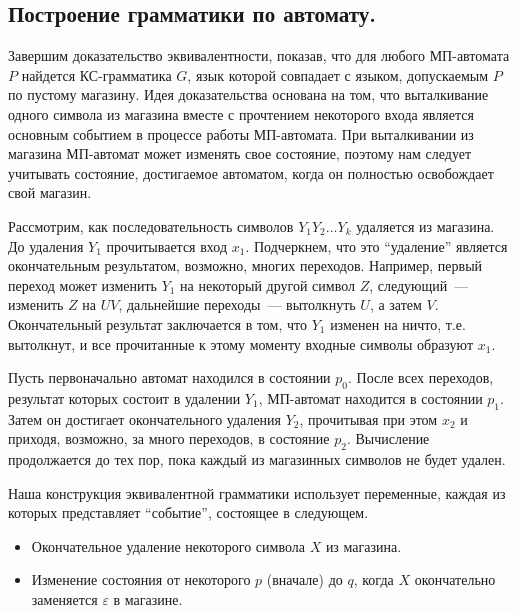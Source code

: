 \documentclass[a4paper,12pt]{article}
\begin{document}
\subsection{Построение грамматики по автомату.}
Завершим доказательство эквивалентности, показав, что для любого МП-автомата $P$ найдется КС-грамматика $G$, язык которой совпадает с языком, допускаемым $P$ по пустому магазину. Идея доказательства основана на том, что выталкивание одного символа из магазина вместе с прочтением некоторого входа является основным событием в процессе работы МП-автомата. При выталкивании из магазина МП-автомат может изменять свое состояние, поэтому нам следует учитывать состояние, достигаемое автоматом, когда он полностью освобождает свой магазин.

Рассмотрим, как последовательность символов $Y_1 Y_2 \ldots Y_k$ удаляется из магазина. До удаления $Y_1$ прочитывается вход $x_1$. Подчеркнем, что это ``удаление'' является окончательным результатом, возможно, многих переходов. Например, первый переход может изменить $Y_1$ на некоторый другой символ $Z$, следующий~--- изменить $Z$ на $UV$, дальнейшие переходы~--- вытолкнуть $U$, а затем $V$. Окончательный результат заключается в том, что $Y_1$ изменен на ничто, т.е. вытолкнут, и все прочитанные к этому моменту входные символы образуют $x_1$.

Пусть первоначально автомат находился в состоянии $p_0$. После всех переходов, результат которых состоит в удалении $Y_1$, МП-автомат находится в состоянии $p_1$. Затем он достигает окончательного удаления $Y_2$, прочитывая при этом $x_2$ и приходя, возможно, за много переходов, в состояние $p_2$. Вычисление продолжается до тех пор, пока каждый из магазинных символов не будет удален.

Наша конструкция эквивалентной грамматики использует переменные, каждая из которых представляет ``событие'', состоящее в следующем.
\begin{itemize}
	\item Окончательное удаление некоторого символа $X$ из магазина.
	\item Изменение состояния от некоторого $p$ (вначале) до $q$, когда $X$ окончательно заменяется $\varepsilon$ в магазине.
\end{itemize}
\end{document}
